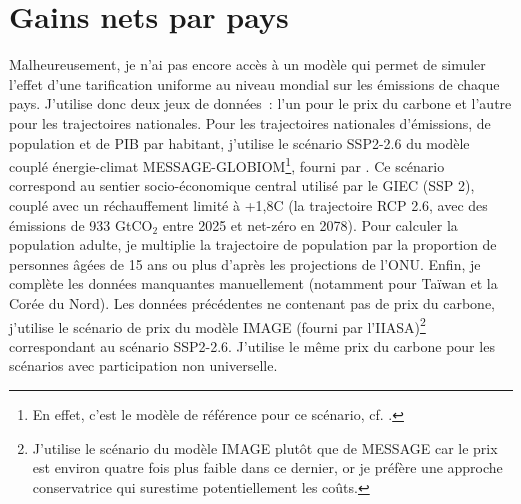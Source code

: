 \documentclass[a5paper,french,openany]{memoir}
\begin{document}
\section{Gains nets par pays}\label{app:pays} 

Malheureusement, je n'ai pas encore accès à un modèle qui permet de simuler l'effet d'une tarification uniforme au niveau mondial sur les émissions de chaque pays. J'utilise donc deux jeux de données~: l'un pour le prix du carbone et l'autre pour les trajectoires nationales. Pour les trajectoires nationales d'émissions, de population et de PIB par habitant, j'utilise le scénario SSP2-2.6 du modèle couplé énergie-climat MESSAGE-GLOBIOM\footnote{En effet, c'est le modèle de référence pour ce scénario, cf. \cite{fricko_marker_2017}.}, fourni par \cite{gutschow_country-resolved_2021}. Ce scénario correspond au sentier socio-économique central utilisé par le GIEC (SSP 2), couplé avec un réchauffement limité à +1,8\textdegree{}C (la trajectoire RCP 2.6, avec des émissions de 933 GtCO$_\text{2}$ entre 2025 et net-zéro en 2078). Pour calculer la population adulte, je multiplie la trajectoire de population par la proportion de personnes âgées de 15 ans ou plus d'après les projections de l'ONU. Enfin, je complète les données manquantes manuellement (notamment pour Taïwan et la Corée du Nord). Les données précédentes ne contenant pas de prix du carbone, j'utilise le scénario de prix du modèle IMAGE (fourni par l'IIASA)\footnote{J'utilise le scénario du modèle IMAGE plutôt que de MESSAGE car le prix est environ quatre fois plus faible dans ce dernier, or je préfère une approche conservatrice qui surestime potentiellement les coûts. 
} correspondant au scénario SSP2-2.6. J'utilise le même prix du carbone pour les scénarios avec participation non universelle. 
\end{document}
